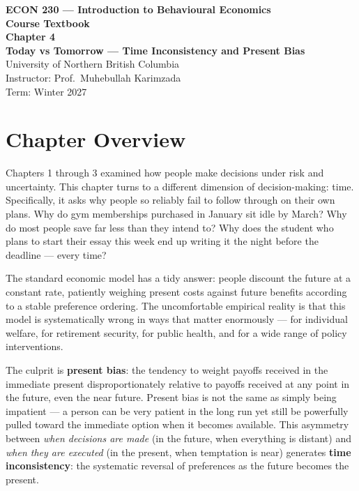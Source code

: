\documentclass[12pt, letterpaper]{article}
\begin{document}
\begin{titlepage}
\centering\vspace*{3cm}
{\Large\bfseries\color{econblue} ECON 230 --- Introduction to Behavioural Economics\\[1em]}
{\large\bfseries Course Textbook\\[2em]}
{\LARGE\bfseries\color{econblue} Chapter 4\\[0.5em]}
{\Large\bfseries Today vs Tomorrow --- Time Inconsistency and Present Bias\\[2em]}
\vfill
{\normalsize University of Northern British Columbia\\
Instructor: Prof.\ Muhebullah Karimzada\\
Term: Winter 2027}
\end{titlepage}
\tableofcontents
\newpage


\medskip


\section*{Chapter Overview}


Chapters 1 through 3 examined how people make decisions under risk and uncertainty. This chapter turns to a different dimension of decision-making: time. Specifically, it asks why people so reliably fail to follow through on their own plans. Why do gym memberships purchased in January sit idle by March? Why do most people save far less than they intend to? Why does the student who plans to start their essay this week end up writing it the night before the deadline --- every time?

The standard economic model has a tidy answer: people discount the future at a constant rate, patiently weighing present costs against future benefits according to a stable preference ordering. The uncomfortable empirical reality is that this model is systematically wrong in ways that matter enormously --- for individual welfare, for retirement security, for public health, and for a wide range of policy interventions.

The culprit is \textbf{present bias}: the tendency to weight payoffs received in the immediate present disproportionately relative to payoffs received at any point in the future, even the near future. Present bias is not the same as simply being impatient --- a person can be very patient in the long run yet still be powerfully pulled toward the immediate option when it becomes available. This asymmetry between \textit{when decisions are made} (in the future, when everything is distant) and \textit{when they are executed} (in the present, when temptation is near) generates \textbf{time inconsistency}: the systematic reversal of preferences as the future becomes the present.
\end{document}
